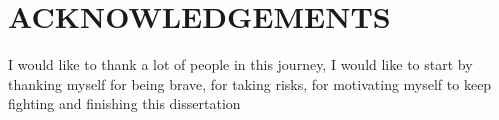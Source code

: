 \chapter{ACKNOWLEDGEMENTS}
\vspace{\baselineskip}
\doublespacing


I would like to thank a lot of people in this journey, I would like to start by thanking myself for being brave, for taking risks, for motivating myself to keep fighting and finishing this dissertation